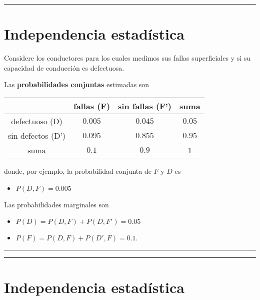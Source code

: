 \documentclass[
]{book}
\providecommand{\tightlist}{%
  \setlength{\itemsep}{0pt}\setlength{\parskip}{0pt}}
\begin{document}
\begin{center}\rule{0.5\linewidth}{0.5pt}\end{center}

\hypertarget{independencia-estaduxedstica-1}{%
\section{Independencia estadística}\label{independencia-estaduxedstica-1}}

Considere los conductores para los cuales medimos sus fallas superficiales y si su capacidad de conducción es defectuosa.

Las \textbf{probabilidades conjuntas} estimadas son

\begin{longtable}[]{@{}cccc@{}}
\toprule
& fallas (F) & sin fallas (F') & suma \\
\midrule
\endhead
defectuoso (D) & \(0.005\) & \(0.045\) & \(0.05\) \\
sin defectos (D') & \(0.095\) & \(0.855\) & \(0.95\) \\
suma & \(0.1\) & \(0.9\) & 1 \\
\bottomrule
\end{longtable}

donde, por ejemplo, la probabilidad conjunta de \(F\) y \(D\) es

\begin{itemize}
\tightlist
\item
  \(P(D,F)=0.005\)
\end{itemize}

Las probabilidades marginales son

\begin{itemize}
\tightlist
\item
  \(P(D)=P(D, F) + P(D, F')=0.05\)
\item
  \(P(F)=P(D, F) + P(D', F)= 0.1\).
\end{itemize}

\begin{center}\rule{0.5\linewidth}{0.5pt}\end{center}

\begin{center}\rule{0.5\linewidth}{0.5pt}\end{center}

\hypertarget{independencia-estaduxedstica-2}{%
\section{Independencia estadística}\label{independencia-estaduxedstica-2}}
\end{document}
